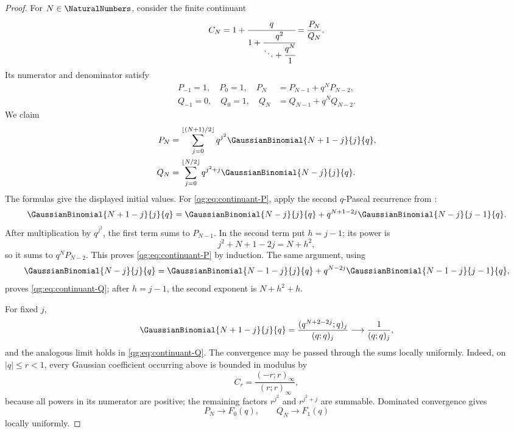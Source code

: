 \begin{proof}
For \(N\in\NaturalNumbers\), consider the finite continuant
\[
 C_N
 =1+\cfrac{q}{
  1+\cfrac{q^2}{
  \ddots+\cfrac{q^N}{1}}}
 =\frac{P_N}{Q_N}.
\]
Its numerator and denominator satisfy
\begin{align*}
 P_{-1}=1,\quad P_0=1,\quad
 P_N&=P_{N-1}+q^NP_{N-2},\\
 Q_{-1}=0,\quad Q_0=1,\quad
 Q_N&=Q_{N-1}+q^NQ_{N-2}.
\end{align*}
We claim
\begin{align}
 P_N
 &=\sum_{j=0}^{\lfloor(N+1)/2\rfloor}
   q^{j^2}\GaussianBinomial{N+1-j}{j}{q},
 \label{qg:eq:continuant-P}\\
 Q_N
 &=\sum_{j=0}^{\lfloor N/2\rfloor}
   q^{j^2+j}\GaussianBinomial{N-j}{j}{q}.
 \label{qg:eq:continuant-Q}
\end{align}
The formulas give the displayed initial values.  For
\eqref{qg:eq:continuant-P}, apply the second \(q\)-Pascal recurrence
from :
\[
 \GaussianBinomial{N+1-j}{j}{q}
 =
 \GaussianBinomial{N-j}{j}{q}
 +q^{N+1-2j}\GaussianBinomial{N-j}{j-1}{q}.
\]
After multiplication by \(q^{j^2}\), the first term sums to
\(P_{N-1}\).  In the second term put \(h=j-1\); its power is
\[
 j^2+N+1-2j=N+h^2,
\]
so it sums to \(q^NP_{N-2}\).  This proves
\eqref{qg:eq:continuant-P} by induction.  The same argument, using
\[
 \GaussianBinomial{N-j}{j}{q}
 =
 \GaussianBinomial{N-1-j}{j}{q}
 +q^{N-2j}\GaussianBinomial{N-1-j}{j-1}{q},
\]
proves \eqref{qg:eq:continuant-Q}; after \(h=j-1\), the second
exponent is \(N+h^2+h\).

For fixed \(j\),
\[
 \GaussianBinomial{N+1-j}{j}{q}
 =\frac{(q^{N+2-2j};q)_j}{(q;q)_j}
 \longrightarrow\frac1{(q;q)_j},
\]
and the analogous limit holds in
\eqref{qg:eq:continuant-Q}.  The convergence may be passed through
the sums locally uniformly.  Indeed, on \(|q|\le r<1\), every Gaussian
coefficient occurring above is bounded in modulus by
\[
 C_r=\frac{(-r;r)_\infty}{(r;r)_\infty},
\]
because all powers in its numerator are positive; the remaining factors
\(r^{j^2}\) and \(r^{j^2+j}\) are summable.  Dominated convergence gives
\[
  P_N\longrightarrow F_0(q),
  \qquad
  Q_N\longrightarrow F_1(q)
\]
locally uniformly.


\end{proof}

